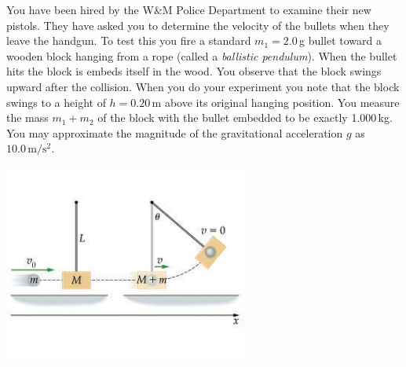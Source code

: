 \documentclass[letterpaper,addpoints,answers]{exam}
\begin{document}
\begin{questions}
\pagebreak


\begin{question}
You have been hired by the W\&M Police Department to examine their new pistols. They have asked you to determine the velocity of the bullets when they leave the handgun. To test this you fire a standard $m_1 = 2.0$\,g bullet toward a wooden block hanging from a rope (called a \emph{ballistic pendulum}). When the bullet hits the block is embeds itself in the wood. You observe that the block swings upward after the collision. When you do your experiment you note that the block swings to a height of $h = 0.20$\,m above its original hanging position. You measure the mass $m_1 + m_2$ of the block with the bullet embedded to be exactly 1.000\,kg. You may approximate the magnitude of the gravitational acceleration $g$ as $10.0\,\mbox{m}/\mbox{s}^2$.
\begin{center}
 \includegraphics[width=0.6\textwidth]{ballistic_pendulum}
\end{center}

\end{question}
\end{questions}
\end{document}
